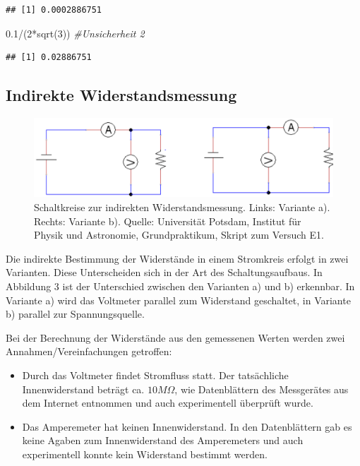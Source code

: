 \documentclass[class=article, crop=false]{standalone}
\newenvironment{Shaded}{\begin{snugshade}}{\end{snugshade}}
\newcommand{\CommentTok}[1]{\textcolor[rgb]{0.56,0.35,0.01}{\textit{#1}}}
\newcommand{\DecValTok}[1]{\textcolor[rgb]{0.00,0.00,0.81}{#1}}
\newcommand{\FloatTok}[1]{\textcolor[rgb]{0.00,0.00,0.81}{#1}}
\newcommand{\FunctionTok}[1]{\textcolor[rgb]{0.00,0.00,0.00}{#1}}
\newcommand{\NormalTok}[1]{#1}
\newcommand{\SpecialCharTok}[1]{\textcolor[rgb]{0.00,0.00,0.00}{#1}}
\begin{document}
\begin{verbatim}
## [1] 0.0002886751
\end{verbatim}

\begin{Shaded}
\begin{Highlighting}[]
\FloatTok{0.1}\SpecialCharTok{/}\NormalTok{(}\DecValTok{2}\SpecialCharTok{*}\FunctionTok{sqrt}\NormalTok{(}\DecValTok{3}\NormalTok{)) }\CommentTok{\#Unsicherheit 2}
\end{Highlighting}
\end{Shaded}

\begin{verbatim}
## [1] 0.02886751
\end{verbatim}

\hypertarget{indirekte-widerstandsmessung}{%
\subsection{Indirekte
Widerstandsmessung}\label{indirekte-widerstandsmessung}}

\begin{figure}
\centering
\includegraphics[width=\textwidth,height=0.15\textheight]{Bilder/Schaltkreis.png}
\caption{Schaltkreise zur indirekten Widerstandsmessung. Links: Variante
a). Rechts: Variante b). Quelle: Universität Potsdam, Institut für
Physik und Astronomie, Grundpraktikum, Skript zum Versuch E1.}
\end{figure}

Die indirekte Bestimmung der Widerstände in einem Stromkreis erfolgt in
zwei Varianten. Diese Unterscheiden sich in der Art des
Schaltungsaufbaus. In Abbildung 3 ist der Unterschied zwischen den
Varianten a) und b) erkennbar. In Variante a) wird das Voltmeter
parallel zum Widerstand geschaltet, in Variante b) parallel zur
Spannungsquelle.

Bei der Berechnung der Widerstände aus den gemessenen Werten werden zwei
Annahmen/Vereinfachungen getroffen:

\begin{itemize}
  \item Durch das Voltmeter findet Stromfluss statt. Der tatsächliche Innenwiderstand beträgt ca. $10M\Omega$, wie Datenblättern des Messgerätes aus dem Internet entnommen und auch experimentell überprüft wurde.
  \item Das Amperemeter hat keinen Innenwiderstand. In den Datenblättern gab es keine Agaben zum Innenwiderstand des Amperemeters und auch experimentell konnte kein Widerstand bestimmt werden.
\end{itemize}
\end{document}
